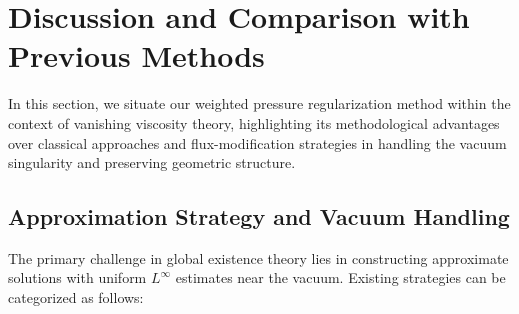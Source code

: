 \documentclass[12pt, reqno]{article}
\theoremstyle{definition}
\numberwithin{equation}{section}
\begin{document}

\section{Discussion and Comparison with Previous Methods}
\label{sec:comparison}

In this section, we situate our weighted pressure regularization method within the context of vanishing viscosity theory, highlighting its methodological advantages over classical approaches and flux-modification strategies in handling the vacuum singularity and preserving geometric structure.

\subsection{Approximation Strategy and Vacuum Handling}

The primary challenge in global existence theory lies in constructing approximate solutions with uniform $L^\infty$ estimates near the vacuum. Existing strategies can be categorized as follows:
\end{document}
